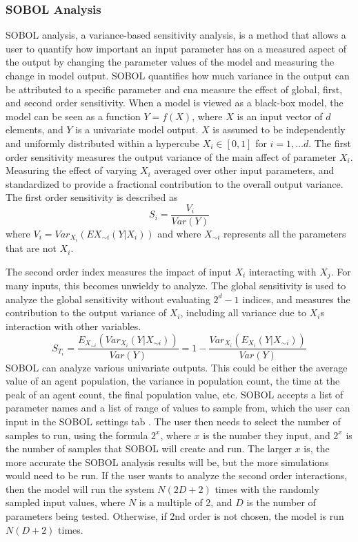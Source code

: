 \subsubsection{SOBOL Analysis}
SOBOL analysis, a variance-based sensitivity analysis, is a method that allows a user to quantify how important an input parameter has on a measured aspect of the output by changing the parameter values of the model and measuring the change in model output. 
SOBOL quantifies how much variance in the output can be attributed to a specific parameter and cna measure the effect of global, first, and second order sensitivity.  
When a model is viewed as a black-box model, the model can be seen as a function $Y=f(X)$, where $X$ is an input vector of $d$ elements, and $Y$ is a univariate model output. 
$X$ is assumed to be independently and uniformly distributed within a hypercube $X_i \in [0, 1]$ for $i=1, \dots d$. 
The first order sensitivity measures the output variance of the main affect of parameter $X_i$. 
Measuring the effect of varying $X_i$ averaged over other input parameters, and standardized to provide a fractional contribution to the overall output variance. 
The first order sensitivity is described as 
\[
    S_i = \frac{V_i}{Var(Y)}
\] where $V_i = Var_{X_i}(E{X_{\sim i}}(Y|X_i))$ and where $X_{\sim i}$ represents all the parameters that are not $X_i$. 
\newline

The second order index measures the impact of input $X_i$ interacting with $X_j$. For many inputs, this becomes unwieldy to analyze. 
The global sensitivity is used to analyze the global sensitivity without evaluating $2^d-1$ indices, and measures the contribution to the output variance of $X_i$, including all variance due to $X_i$s interaction with other variables. 
\[
    S_{T_i} = \frac{E_{X_{\sim i}}(Var_{X_i}(Y|X_{\sim i}))}{Var(Y)} = 1 - \frac{Var_{X_i}(E_{X_i}(Y|X_{\sim i}))}{Var(Y)}
\]
SOBOL can analyze various univariate outputs. 
This could be either the average value of an agent population, the variance in population count, the time at the peak of an agent count, the final population value, etc. \newline
SOBOL accepts a list of parameter names and a list of range of values to sample from, which the user can input in the SOBOL settings tab . 
The user then needs to select the number of samples to run, using the formula $2^x$, where $x$ is the number they input, and $2^x$ is the number of samples that SOBOL will create and run. 
The larger $x$ is, the more accurate the SOBOL analysis results will be, but the more simulations would need to be run. \newline 
If the user wants to analyze the second order interactions, then the model will run the system $N(2D+2)$ times with the randomly sampled input values, where $N$ is a multiple of 2, and $D$ is the number of parameters being tested. 
Otherwise, if 2nd order is not chosen, the model is run $N(D+2)$ times. 

